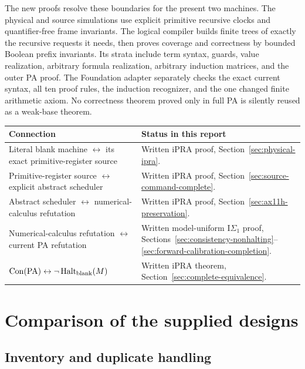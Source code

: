 \documentclass[11pt,a4paper]{article}
\newcommand{\PA}{\mathrm{PA}}
\newcommand{\Con}{\operatorname{Con}}
\newcommand{\Halt}{\operatorname{Halt}}
\newcommand{\IS}{\mathrm{I}\Sigma_1}
\begin{document}
The new proofs resolve these boundaries for the present two machines.
The physical and source simulations use explicit primitive recursive
clocks and quantifier-free frame invariants. The logical compiler builds
finite trees of exactly the recursive requests it needs, then proves
coverage and correctness by bounded Boolean prefix invariants. Its
strata include term syntax, guards, value realization, arbitrary formula
realization, arbitrary induction matrices, and the outer PA proof.
The Foundation adapter separately checks the exact current syntax,
all ten proof rules, the induction recognizer, and the one changed
finite arithmetic axiom. No correctness theorem proved only in full PA
is silently reused as a weak-base theorem.

\begin{center}
\begin{tabular}{@{}p{}p{}@{}}
\toprule
Connection & Status in this report\\\midrule
Literal blank machine $\leftrightarrow$ its exact primitive-register source
 & Written iPRA proof, Section~\ref{sec:physical-ipra}.\\
Primitive-register source $\leftrightarrow$ explicit abstract scheduler
 & Written iPRA proof, Section~\ref{sec:source-command-complete}.\\
Abstract scheduler $\leftrightarrow$ numerical-calculus refutation
 & Written iPRA proof, Section~\ref{sec:ax11h-preservation}.\\
Numerical-calculus refutation $\leftrightarrow$ current PA refutation
 & Written model-uniform $\IS$ proof, Sections~\ref{sec:consistency-nonhalting}--\ref{sec:forward-calibration-completion}.\\
$\Con(\PA)\leftrightarrow\neg\Halt_{\rm blank}(M)$
 & Written iPRA theorem, Section~\ref{sec:complete-equivalence}.\\
\bottomrule
\end{tabular}
\end{center}

\section{Comparison of the supplied designs}
\label{sec:comparison}

\subsection{Inventory and duplicate handling}
\end{document}
